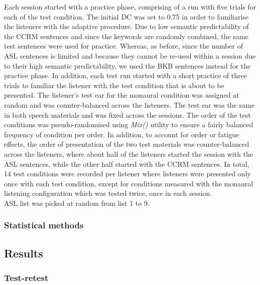 \documentclass[a4paper, twoside]{templates/ociamthesis}
\begin{document}
Each session started with a practice phase, comprising of a run with five trials for each of the test condition. The initial DC was set to 0.75 in order to familiarise the listeners with the adaptive procedure. Due to low semantic predictability of the CCRM sentences and since the keywords are randomly combined, the same test sentences were used for practice. Whereas, as before, since the number of ASL sentences is limited and because they cannot be re-used within a session due to their high semantic predictability, we used the BKB sentences instead for the practice phase. In addition, each test run started with a short practice of three trials to familiar the listener with the test condition that is about to be presented. The listener's test ear for the monaural condition was assigned at random and was counter-balanced across the listeners. The test ear was the same in both speech materials and was fixed across the sessions. The order of the test conditions was pseudo-randomised using \emph{Mix()} utility \autocite{MixUtility} to ensure a fairly balanced frequency of condition per order. In addition, to account for order or fatigue effects, the order of presentation of the two test materials was counter-balanced across the listeners, where about half of the listeners started the session with the ASL sentences, while the other half started with the CCRM sentences. In total, 14 test conditions were recorded per listener where listeners were presented only once with each test condition, except for conditions measured with the monaural listening configuration which was tested twice, once in each session.\\

ASL list was picked at random from list 1 to 9.

\hypertarget{statistical-methods}{%
\subsubsection{Statistical methods}\label{statistical-methods}}

\hypertarget{results-2}{%
\subsection{Results}\label{results-2}}

\hypertarget{test-retest}{%
\subsubsection{Test-retest}\label{test-retest}}
\end{document}
